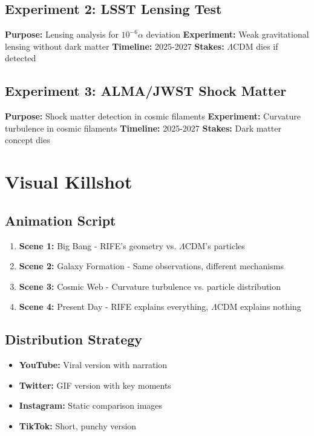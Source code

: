 \documentclass[11pt]{report}
\newcommand{\lamcdm}{$\Lambda$CDM}
\newcommand{\tenminusalpha}{$10^{-6}\alpha$}
\begin{document}
\subsection{Experiment 2: LSST Lensing Test}
\textbf{Purpose:} Lensing analysis for \tenminusalpha{} deviation
\textbf{Experiment:} Weak gravitational lensing without dark matter
\textbf{Timeline:} 2025-2027
\textbf{Stakes:} \lamcdm{} dies if detected

\subsection{Experiment 3: ALMA/JWST Shock Matter}
\textbf{Purpose:} Shock matter detection in cosmic filaments
\textbf{Experiment:} Curvature turbulence in cosmic filaments
\textbf{Timeline:} 2025-2027
\textbf{Stakes:} Dark matter concept dies

\section{Visual Killshot}

\subsection{Animation Script}
\begin{enumerate}
\item \textbf{Scene 1:} Big Bang - RIFE's geometry vs. \lamcdm{}'s particles
\item \textbf{Scene 2:} Galaxy Formation - Same observations, different mechanisms
\item \textbf{Scene 3:} Cosmic Web - Curvature turbulence vs. particle distribution
\item \textbf{Scene 4:} Present Day - RIFE explains everything, \lamcdm{} explains nothing
\end{enumerate}

\subsection{Distribution Strategy}
\begin{itemize}
\item \textbf{YouTube:} Viral version with narration
\item \textbf{Twitter:} GIF version with key moments
\item \textbf{Instagram:} Static comparison images
\item \textbf{TikTok:} Short, punchy version
\end{itemize}
\end{document}
